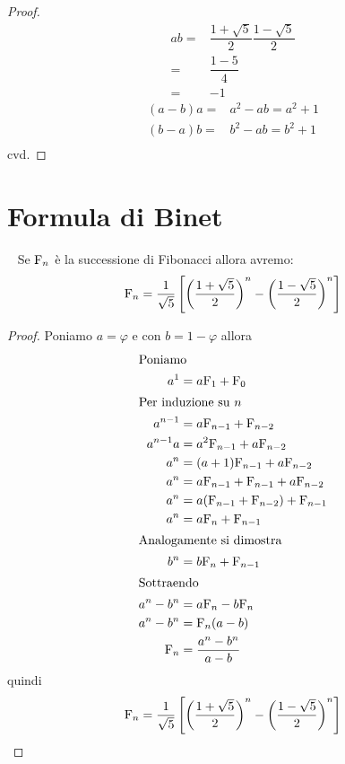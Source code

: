 \begin{proof}
	\begin{align*}
		ab={}&\dfrac{1+\sqrt{5}}{2}\dfrac{1-\sqrt{5}}{2}\\
		={}&\dfrac{1-5}{4}\\
		={}&-1
	\end{align*}
	\begin{align*}
		(a-b)a={}&a^2-ab=a^2+1\\
		(b-a)b={}&b^2-ab=b^2+1\\
	\end{align*}
	cvd.
\end{proof}
\section{Formula di Binet}
\begin{thm}~\cite{Conti2020}\label{thm:FibFormulaBinet}
	Se $\mathrm{F}_{n}$ è la successione di Fibonacci allora avremo:
	\begin{equation}
		\mathrm{F}_{n}=\dfrac{1}{\sqrt{5}}\left[\left(\dfrac{1+\sqrt{5}}{2}\right)^n-\left(\dfrac{1-\sqrt{5}}{2}\right)^n\right]
	\end{equation}\label{eqn:FinBinet}
\end{thm}
\begin{proof}
	Poniamo $a=\varphi$ e con $b=1-\varphi$ allora
	\begin{align*}
		\intertext{Poniamo}
		a^1={}&a\mathrm{F}_{1}+\mathrm{F}_{0}\\
		\intertext{Per induzione su $n$}
		a^{n-1}={}&a\mathrm{F}_{n-1}+\mathrm{F}_{n-2}\\
		a^{n-1}a={}&a^2\mathrm{F}_{n-1}+a\mathrm{F}_{n-2}\\
		a^{n}={}&(a+1)\mathrm{F}_{n-1}+a\mathrm{F}_{n-2}\\
		a^{n}={}&a\mathrm{F}_{n-1}+\mathrm{F}_{n-1}+a\mathrm{F}_{n-2}\\
		a^{n}={}&a(\mathrm{F}_{n-1}+\mathrm{F}_{n-2})+\mathrm{F}_{n-1}\\
		a^{n}={}&a\mathrm{F}_{n}+\mathrm{F}_{n-1}\\
		\intertext{Analogamente si dimostra}
		b^{n}={}&b\mathrm{F}_{n}+\mathrm{F}_{n-1}\\
		\intertext{Sottraendo}
		a^n-b^n={}&a\mathrm{F}_{n}-b\mathrm{F}_{n}\\
		a^n-b^n={}&\mathrm{F}_{n}(a-b)\\
		\mathrm{F}_{n}={}&\dfrac{a^n-b^n}{a-b}
	\end{align*}
quindi
\begin{equation}
\mathrm{F}_{n}=\dfrac{1}{\sqrt{5}}\left[\left(\dfrac{1+\sqrt{5}}{2}\right)^n-\left(\dfrac{1-\sqrt{5}}{2}\right)^n\right]
\end{equation}
\end{proof}
